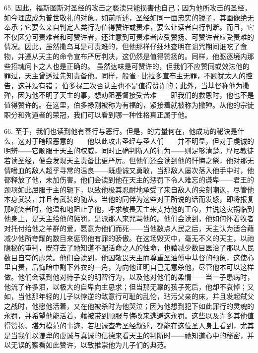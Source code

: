 65. 因此，福斯图斯对圣经的攻击之亵渎只能损害他自己；因为他所攻击的圣经，如今理应成为普世敬礼的对象。如前所述，圣经如同一面忠实的镜子，其画像绝无奉承；它要么亲自判定人类行为值得赞许或责难，要么让读者自行判断。而且，它不仅区分可责难者和可赞许者，还注意到可责难者应受赞扬、可赞许者应受责难的情况。因此，虽然撒乌耳是可责难的，但他那样仔细地查明在诅咒期间谁吃了食物，并遵从天主的命令宣布严厉判决，这仍然是值得赞扬的。同样，他驱逐境内那些招魂问卜之人也是正确的。 虽然达味是可赞许的，但我们不应赞同或效法他的罪过，天主曾透过先知责备他。同样，般雀·比拉多宣布主无罪，不顾犹太人的控告，这并没有错； 伯多禄三次否认主也不是值得赞许的；此外，当基督称他为撒殚，因为他不明了天主的事，想劝阻基督接受苦难——即我们的救恩时，他也不是值得赞许的。在这里，伯多禄刚被称为有福的，紧接着就被称为撒殚。从他的宗徒职分和殉道者的荣冠，我们可以看到哪一种性格真正属于他。\par

66. 至于，我们也读到他有善行与恶行。但是，的力量何在，他成功的秘诀是什么，这对于瞎眼恶意的——他以此攻击圣经与圣人们——并不明显，但对于虔诚的明辨——它顺服于天主的权威，同时正确判断人的行为——则足够清楚。摩尼教徒若读圣经，便会发现天主责备比更严厉。但他们还会读到他的忏悔之祭，他对那无情嗜血的敌人超乎寻常的温良——既虔诚又勇敢，当那敌人屡次落入他手中时，他都释放了他，未加伤害。他们会读到他在天主的惩罚下令人难忘的谦卑——君王的颈项如此屈服于主的轭下，以致他极其忍耐地承受了来自敌人的尖刻嘲讽，尽管他本身武装，并且有武装的随从。当他的同伴为这些对王所说的话而发怒，即将报复那嘲笑者时，他温和地阻止了他，呼求敬畏天主来支持他的王命，并说这灾祸临到他身上，是天主给他的惩罚，是派那人来咒骂他的。他们会读到，他如何怀着牧者对托付给他之羊群的爱，愿意为他们而死——当他数点人民之后，天主认为适合藉减少他所夸耀的数目来惩罚他有罪的骄傲。在这场毁灭中，毫无不义的天主，以祂隐秘的审判，既夺去了祂知道不配活命之人的性命，也藉减少数目医治了那以人民数目自夸的虚荣。他们会读到，他因敬畏天主而尊重圣油傅中基督的预象，这使心里自责，后悔暗中割下外衣的一角，为向他证明自己无意杀他，尽管他本可以这样做。他们会读到他对待子女的明智行为，以及他对他们的柔情——当一子患病时，他流了许多泪，以极大的自卑向主恳求；但当那无辜的孩子死后，他却不哀悼；又如，当他那年轻的儿子以悖逆的敌意行可耻的乱伦，玷污父亲的床，并且发起弑父之战时，他愿他活着，又在他被杀时为他哭泣；因为他想到犯下如此罪行的灵魂的永罚，并希望他能活着，藉被带到顺服与悔改来逃避这永罚。这些以及许多其他值得赞扬、堪为模范的事迹，若坦诚查考圣经叙述，都能在这位圣人身上看到，尤其是当我们以谦卑的虔诚与真诚的信德来看天主的判断时——祂知道心中的秘密，并以无误的察看如此赞许，以致推崇他为儿子们的典范。\par

